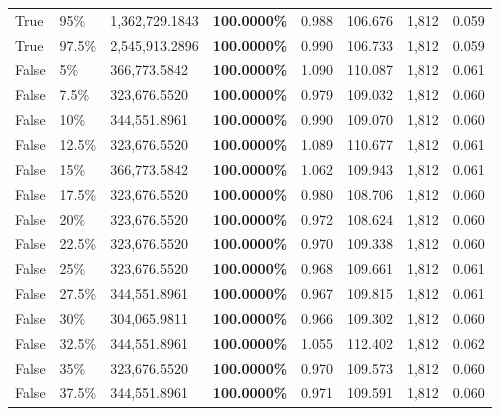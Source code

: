 \begin{table}[H]
\begin{tabular}{lllrllll}
\cline{1-8} \cline{2-8}
True & 95\% & 1,362,729.1843 & \bfseries \color{red} 100.0000\% & 0.988 & 106.676 & 1,812 & 0.059 \\
\cline{1-8} \cline{2-8}
True & 97.5\% & 2,545,913.2896 & \bfseries \color{red} 100.0000\% & 0.990 & 106.733 & 1,812 & 0.059 \\
\cline{1-8} \cline{2-8}
False & 5\% & 366,773.5842 & \bfseries \color{red} 100.0000\% & 1.090 & 110.087 & 1,812 & 0.061 \\
\cline{1-8} \cline{2-8}
False & 7.5\% & 323,676.5520 & \bfseries \color{red} 100.0000\% & 0.979 & 109.032 & 1,812 & 0.060 \\
\cline{1-8} \cline{2-8}
False & 10\% & 344,551.8961 & \bfseries \color{red} 100.0000\% & 0.990 & 109.070 & 1,812 & 0.060 \\
\cline{1-8} \cline{2-8}
False & 12.5\% & 323,676.5520 & \bfseries \color{red} 100.0000\% & 1.089 & 110.677 & 1,812 & 0.061 \\
\cline{1-8} \cline{2-8}
False & 15\% & 366,773.5842 & \bfseries \color{red} 100.0000\% & 1.062 & 109.943 & 1,812 & 0.061 \\
\cline{1-8} \cline{2-8}
False & 17.5\% & 323,676.5520 & \bfseries \color{red} 100.0000\% & 0.980 & 108.706 & 1,812 & 0.060 \\
\cline{1-8} \cline{2-8}
False & 20\% & 323,676.5520 & \bfseries \color{red} 100.0000\% & 0.972 & 108.624 & 1,812 & 0.060 \\
\cline{1-8} \cline{2-8}
False & 22.5\% & 323,676.5520 & \bfseries \color{red} 100.0000\% & 0.970 & 109.338 & 1,812 & 0.060 \\
\cline{1-8} \cline{2-8}
False & 25\% & 323,676.5520 & \bfseries \color{red} 100.0000\% & 0.968 & 109.661 & 1,812 & 0.061 \\
\cline{1-8} \cline{2-8}
False & 27.5\% & 344,551.8961 & \bfseries \color{red} 100.0000\% & 0.967 & 109.815 & 1,812 & 0.061 \\
\cline{1-8} \cline{2-8}
False & 30\% & \color{red} 304,065.9811 & \bfseries \color{red} 100.0000\% & 0.966 & 109.302 & 1,812 & 0.060 \\
\cline{1-8} \cline{2-8}
False & 32.5\% & 344,551.8961 & \bfseries \color{red} 100.0000\% & 1.055 & 112.402 & 1,812 & 0.062 \\
\cline{1-8} \cline{2-8}
False & 35\% & 323,676.5520 & \bfseries \color{red} 100.0000\% & 0.970 & 109.573 & 1,812 & 0.060 \\
\cline{1-8} \cline{2-8}
False & 37.5\% & 344,551.8961 & \bfseries \color{red} 100.0000\% & 0.971 & 109.591 & 1,812 & 0.060 \\

\end{tabular}
\end{table}
